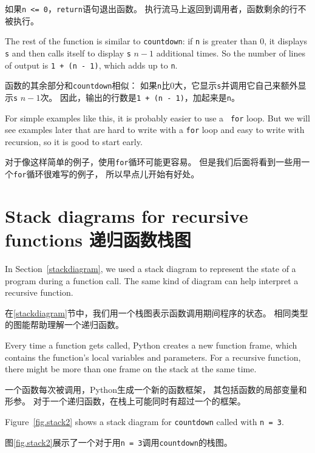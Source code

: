 \documentclass[10pt]{book}
\begin{document}
\begin{CJK}{UTF8}{gbsn}
如果{\tt n <= 0}，{\tt return}语句退出函数。
执行流马上返回到调用者，函数剩余的行不被执行。

The rest of the function is similar to {\tt countdown}: if {\tt n} is
greater than 0, it displays {\tt s} and then calls itself to display
{\tt s} $n-1$ additional times.  So the number of lines of output
is {\tt 1 + (n - 1)}, which adds up to {\tt n}.

函数的其余部分和{\tt countdown}相似：
如果{\tt n}比0大，它显示{\tt s}并调用它自己来额外显示{\tt s} $n-1$次。
因此，输出的行数是{\tt 1 + (n - 1)}，加起来是{\tt n}。

For simple examples like this, it is probably easier to use a {\tt
for} loop.  But we will see examples later that are hard to write
with a {\tt for} loop and easy to write with recursion, so it is
good to start early.

对于像这样简单的例子，使用{\tt for}循环可能更容易。
但是我们后面将看到一些用一个{\tt for}循环很难写的例子，
所以早点儿开始有好处。


\section{Stack diagrams for recursive functions 递归函数栈图}
\label{recursive.stack}

In Section~\ref{stackdiagram}, we used a stack diagram to represent
the state of a program during a function call.  The same kind of
diagram can help interpret a recursive function.

在\ref{stackdiagram}节中，我们用一个栈图表示函数调用期间程序的状态。
相同类型的图能帮助理解一个递归函数。

Every time a function gets called, Python creates a new function
frame, which contains the function's local variables and parameters.
For a recursive function, there might be more than one frame on the
stack at the same time.

一个函数每次被调用，Python生成一个新的函数框架，
其包括函数的局部变量和形参。
对于一个递归函数，在栈上可能同时有超过一个的框架。

Figure~\ref{fig.stack2} shows a stack diagram for {\tt countdown} called with
{\tt n = 3}.

图\ref{fig.stack2}展示了一个对于用{\tt n = 3}调用{\tt countdown}的栈图。


\end{CJK}
\end{document}
